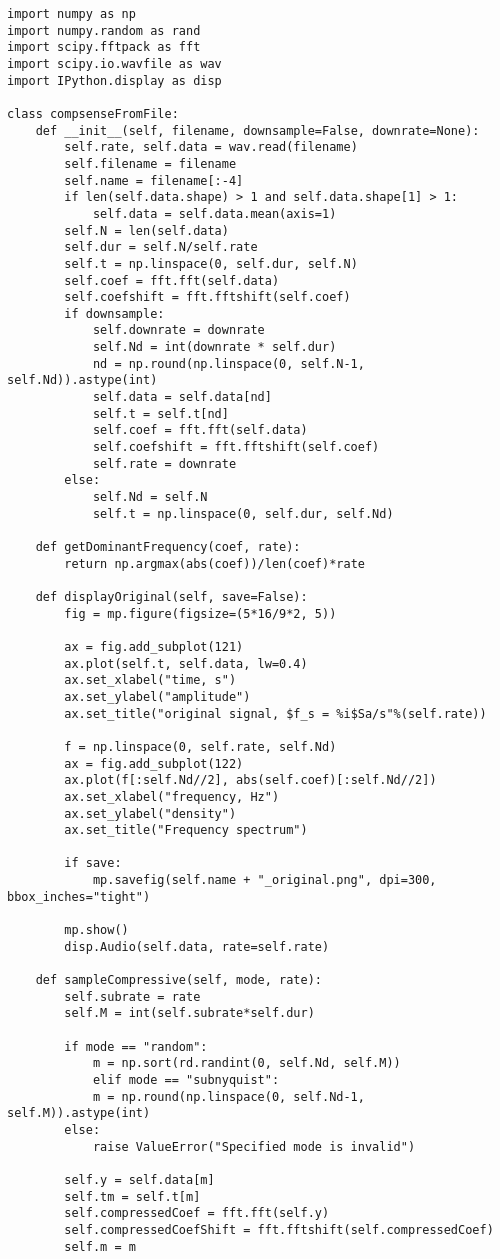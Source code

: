 \begin{lstlisting}
import numpy as np
import numpy.random as rand
import scipy.fftpack as fft
import scipy.io.wavfile as wav
import IPython.display as disp

class compsenseFromFile:
	def __init__(self, filename, downsample=False, downrate=None):
		self.rate, self.data = wav.read(filename)
		self.filename = filename
		self.name = filename[:-4]
		if len(self.data.shape) > 1 and self.data.shape[1] > 1:
			self.data = self.data.mean(axis=1)
		self.N = len(self.data)
		self.dur = self.N/self.rate
		self.t = np.linspace(0, self.dur, self.N)
		self.coef = fft.fft(self.data)
		self.coefshift = fft.fftshift(self.coef)
		if downsample:
			self.downrate = downrate
			self.Nd = int(downrate * self.dur)
			nd = np.round(np.linspace(0, self.N-1, self.Nd)).astype(int)
			self.data = self.data[nd]
			self.t = self.t[nd]
			self.coef = fft.fft(self.data)
			self.coefshift = fft.fftshift(self.coef)
			self.rate = downrate
		else:
			self.Nd = self.N
			self.t = np.linspace(0, self.dur, self.Nd)
			
	def getDominantFrequency(coef, rate):
		return np.argmax(abs(coef))/len(coef)*rate
	
	def displayOriginal(self, save=False):
		fig = mp.figure(figsize=(5*16/9*2, 5))
	
		ax = fig.add_subplot(121)
		ax.plot(self.t, self.data, lw=0.4)
		ax.set_xlabel("time, s")
		ax.set_ylabel("amplitude")
		ax.set_title("original signal, $f_s = %i$Sa/s"%(self.rate))
		
		f = np.linspace(0, self.rate, self.Nd)
		ax = fig.add_subplot(122)
		ax.plot(f[:self.Nd//2], abs(self.coef)[:self.Nd//2])
		ax.set_xlabel("frequency, Hz")
		ax.set_ylabel("density")
		ax.set_title("Frequency spectrum")
		
		if save:
			mp.savefig(self.name + "_original.png", dpi=300, bbox_inches="tight")
		
		mp.show()
		disp.Audio(self.data, rate=self.rate)
	
	def sampleCompressive(self, mode, rate):
		self.subrate = rate
		self.M = int(self.subrate*self.dur)
	
		if mode == "random":
			m = np.sort(rd.randint(0, self.Nd, self.M))
			elif mode == "subnyquist":
			m = np.round(np.linspace(0, self.Nd-1, self.M)).astype(int)
		else:
			raise ValueError("Specified mode is invalid")
		
		self.y = self.data[m]
		self.tm = self.t[m]
		self.compressedCoef = fft.fft(self.y)
		self.compressedCoefShift = fft.fftshift(self.compressedCoef)
		self.m = m
	

\end{lstlisting}

